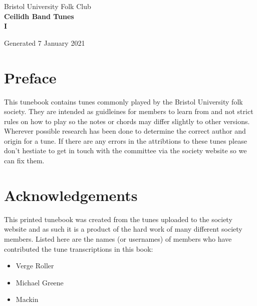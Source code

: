 \documentclass[12pt,a4paper,twoside]{article}
\makeatletter
\newcommand{\thetitle}{Ceilidh Band Tunes \\ \vspace{0.65cm} I}
\newcommand{\thedate}{7 January 2021}
\renewcommand\tableofcontents{%
    \begin{multicols}{2}[
      \centering
      \section*{\large\contentsname
        \@mkboth{%
           \MakeUppercase\contentsname}{\MakeUppercase\contentsname}}]
    \@starttoc{toc}%
    \end{multicols}
}
\makeatother
\begin{document}
\begin{titlepage}
   \begin{center}
       \large Bristol University Folk Club \\

       \vspace{4cm}
       \textbf{\Huge \thetitle}

       \vspace{0.5cm}
       Generated \thedate

       \vspace{1.5cm}

       \vfill

   \end{center}
\end{titlepage}

\tableofcontents

\section{Preface}

This tunebook contains tunes commonly played by the Bristol University folk society. They are intended as guidleines for members to learn from and not strict rules on how to play so the notes or chords may differ slightly to other versions.
Wherever possible research has been done to determine the correct author and origin for a tune. If there are any errors in the attribtions to these tunes please don't hestiate to get in touch with the committee via the society website so we can fix them.

\section{Acknowledgements}

This printed tunebook was created from the tunes uploaded to the society website and as such it is a product of the hard work of many different society members. Listed here are the names (or usernames) of members who have contributed the tune transcriptions in this book:

\begin{multicols}{2}
\begin{itemize}\item Verge Roller
\item Michael Greene
\item Mackin
\end{itemize}

\end{multicols}
\end{document}
